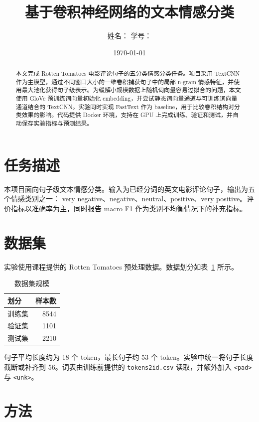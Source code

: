 \documentclass[UTF8,a4paper,12pt]{ctexart}
\title{基于卷积神经网络的文本情感分类}
\author{姓名：\underline{\hspace{4cm}} \quad 学号：\underline{\hspace{4cm}}}
\date{\today}
\begin{document}
\maketitle

\begin{abstract}
本文完成 Rotten Tomatoes 电影评论句子的五分类情感分类任务。项目采用 TextCNN 作为主模型，通过不同窗口大小的一维卷积捕获句子中的局部 n-gram 情感特征，并使用最大池化获得句子级表示。为缓解小规模数据上随机词向量容易过拟合的问题，本文使用 GloVe 预训练词向量初始化 embedding，并尝试静态词向量通道与可训练词向量通道结合的 TextCNN。实验同时实现 FastText 作为 baseline，用于比较卷积结构对分类效果的影响。代码提供 Docker 环境，支持在 GPU 上完成训练、验证和测试，并自动保存实验指标与预测结果。
\end{abstract}

\section{任务描述}

本项目面向句子级文本情感分类。输入为已经分词的英文电影评论句子，输出为五个情感类别之一：
very negative、negative、neutral、positive、very positive。评价指标以准确率为主，同时报告 macro F1 作为类别不均衡情况下的补充指标。

\section{数据集}

实验使用课程提供的 Rotten Tomatoes 预处理数据。数据划分如表~\ref{tab:data} 所示。

\begin{table}[h]
\centering
\caption{数据集规模}
\label{tab:data}
\begin{tabular}{lr}
\toprule
划分 & 样本数 \\
\midrule
训练集 & 8544 \\
验证集 & 1101 \\
测试集 & 2210 \\
\bottomrule
\end{tabular}
\end{table}

句子平均长度约为 18 个 token，最长句子约 53 个 token。实验中统一将句子长度截断或补齐到 56。词表由训练前提供的 \texttt{tokens2id.csv} 读取，并额外加入 \texttt{<pad>} 与 \texttt{<unk>}。

\section{方法}
\end{document}
